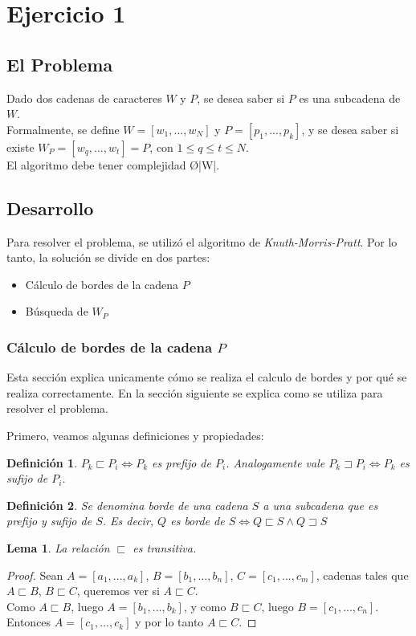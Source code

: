 \newtheorem*{definition}{Definición}
\newtheorem{lem}{Lema}
\section{Ejercicio 1}
\subsection{El Problema}
Dado dos cadenas de caracteres $W$ y $P$, se desea saber si $P$ es una subcadena de $W$.\\
Formalmente, se define $W = [w_1,...,w_N]$ y $P = [p_1,...,p_k]$, y se desea saber si existe $W_P = [w_q,...,w_t] = P$, con $1 \leq q \leq t \leq N$.\\
El algoritmo debe tener complejidad \O{|W|}.

\subsection{Desarrollo}
Para resolver el problema, se utilizó el algoritmo de \emph{Knuth-Morris-Pratt}.
Por lo tanto, la solución se divide en dos partes:
\begin{itemize}
	\item Cálculo de bordes de la cadena $P$
	\item Búsqueda de $W_P$
\end{itemize}

\subsubsection{Cálculo de bordes de la cadena $P$}
Esta sección explica unicamente cómo se realiza el calculo de bordes y por qué se realiza correctamente. En la sección siguiente se explica como se utiliza para resolver el problema.

Primero, veamos algunas definiciones y propiedades:
\begin{definition}
$P_k \sqsubset P_i \Leftrightarrow P_k$ es prefijo de $P_i$. Analogamente vale $P_k \sqsupset P_i \Leftrightarrow P_k$ es sufijo de $P_i$.
\end{definition}
\begin{definition}
Se denomina borde de una cadena $S$ a una subcadena que es prefijo y sufijo de $S$. Es decir, $Q$ es borde de $S \Leftrightarrow Q \sqsubset S \wedge Q \sqsupset S$
\end{definition}

\begin{lem}
La relación $\sqsubset$ es transitiva.
\end{lem}
\begin{proof}
Sean $A = [a_1,...,a_k]$, $B = [b_1,...,b_n]$, $C = [c_1,...,c_m]$, cadenas tales que $A \sqsubset B$, $B \sqsubset C$, queremos ver si $A \sqsubset C$.\\
Como $A \sqsubset B$, luego $A = [b_1,...,b_k]$, y como $B \sqsubset C$, luego $B = [c_1,...,c_n]$. Entonces $A = [c_1,...,c_k]$ y por lo tanto $A \sqsubset C$.
\end{proof}

